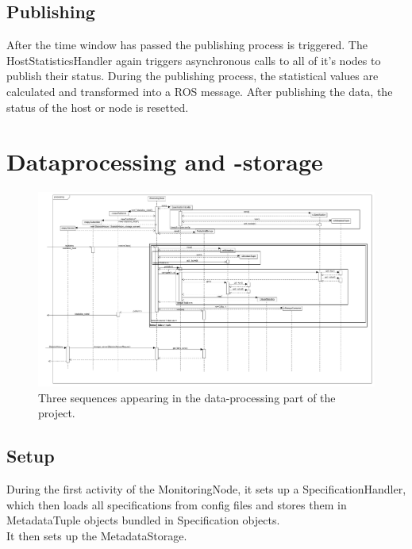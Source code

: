 \subsection{Publishing}
After the time window has passed the publishing process is triggered. The HostStatisticsHandler again triggers asynchronous calls to all of it's nodes to publish their status. During the publishing process, the statistical values are calculated and transformed into a ROS message.
After publishing the data, the status of the host or node is resetted.

\newpage
\section{Dataprocessing and -storage}
\begin{figure}[!ht]
	\begin{center}
		\includegraphics[width=1.0\linewidth]{./diagram_pictures/processing_seq.pdf}
		\caption{Three sequences appearing in the data-processing part of the project.}
	\end{center}
\end{figure}

\subsection*{Setup}
During the first activity of the MonitoringNode, it sets up a SpecificationHandler, which then loads all specifications from config files and stores them in MetadataTuple objects bundled in Specification objects.\\
It then sets up the MetadataStorage.

